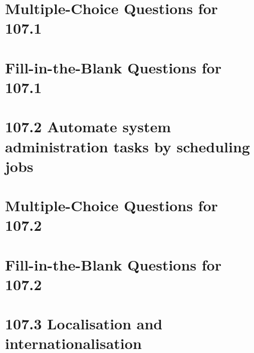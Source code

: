 \documentclass[a4paper]{report}
\begin{document}
\newpage
\section*{Multiple-Choice Questions for 107.1}

\newpage
\section*{Fill-in-the-Blank Questions for 107.1}

\newpage
\section*{107.2 Automate system administration tasks by scheduling jobs}

\newpage
\section*{Multiple-Choice Questions for 107.2}

\newpage
\section*{Fill-in-the-Blank Questions for 107.2}

\newpage
\section*{107.3 Localisation and internationalisation}
\end{document}
